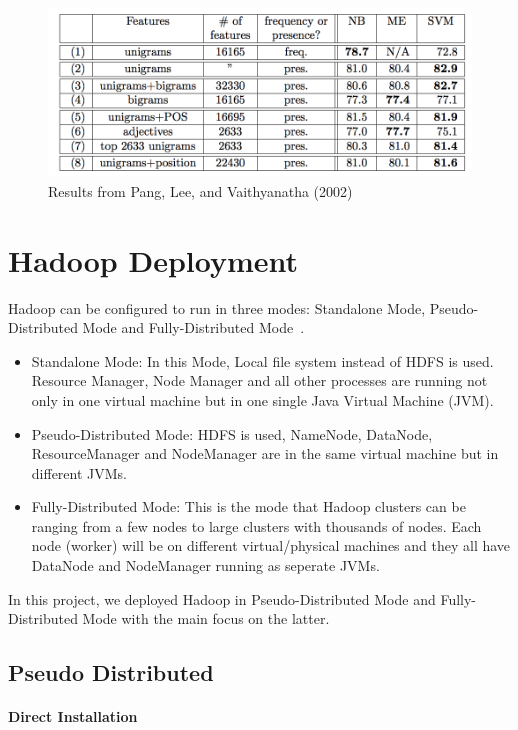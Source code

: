 \begin{figure}[!ht]
	\centering\includegraphics[width=\columnwidth]{images/pang-result.png}
        \caption{Results
	from Pang, Lee, and Vaithyanatha
	(2002)~\cite{hid-sp18-405-sentiment-pang2002thumbs}}\label{f:pang-result}
\end{figure}


\section{Hadoop Deployment}\label{s:hadoopdep}
Hadoop can be configured to run in three modes: Standalone Mode, 
Pseudo-Distributed Mode and Fully-Distributed 
Mode~\cite{hid-sp18-405-hadoop-singlenode}. 
\begin{itemize}
	\item Standalone Mode: In this Mode, Local file system instead of HDFS is 
	used. Resource Manager, Node Manager and all other processes are 
	running not only in one virtual machine but in one single Java Virtual 
	Machine (JVM).
	\item Pseudo-Distributed Mode: HDFS is used, NameNode, DataNode, 
	ResourceManager and NodeManager are in the same virtual machine but in 
	different JVMs. 
	\item Fully-Distributed Mode: This is the mode that Hadoop clusters can be 
	ranging from a few nodes to large clusters with thousands of nodes. Each 
	node (worker) will be on different virtual/physical machines and they all 
	have DataNode and NodeManager running as seperate JVMs.
\end{itemize}
In this project, we deployed Hadoop in Pseudo-Distributed Mode and 
Fully-Distributed Mode with the main focus on the latter. 

\subsection{Pseudo Distributed}
\paragraph{Direct Installation}
